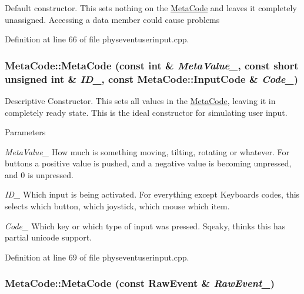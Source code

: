 Default constructor. This sets nothing on the \hyperlink{classMetaCode}{MetaCode} and leaves it completely unassigned. Accessing a data member could cause problems 

Definition at line 66 of file physeventuserinput.cpp.\hypertarget{classMetaCode_aaa5c96e46212847295db722a8253e86a}{
\subsubsection[{MetaCode}]{\setlength{\rightskip}{0pt plus 5cm}MetaCode::MetaCode (const int \& {\em MetaValue\_\-}, \/  const short unsigned int \& {\em ID\_\-}, \/  const {\bf MetaCode::InputCode} \& {\em Code\_\-})}}
\label{d7/d72/classMetaCode_aaa5c96e46212847295db722a8253e86a}


Descriptive Constructor. This sets all values in the \hyperlink{classMetaCode}{MetaCode}, leaving it in completely ready state. This is the ideal constructor for simulating user input. 
\begin{DoxyParams}{Parameters}
\item[{\em MetaValue\_\-}]How much is something moving, tilting, rotating or whatever. For buttons a positive value is pushed, and a negative value is becoming unpressed, and 0 is unpressed. \item[{\em ID\_\-}]Which input is being activated. For everything except Keyboards codes, this selects which button, which joystick, which mouse which item. \item[{\em Code\_\-}]Which key or which type of input was pressed. Sqeaky, thinks this has partial unicode support. \end{DoxyParams}


Definition at line 69 of file physeventuserinput.cpp.\hypertarget{classMetaCode_a87b260ce7ee3a66c75320c0fc37cdc0a}{
\subsubsection[{MetaCode}]{\setlength{\rightskip}{0pt plus 5cm}MetaCode::MetaCode (const RawEvent \& {\em RawEvent\_\-})}}
\label{d7/d72/classMetaCode_a87b260ce7ee3a66c75320c0fc37cdc0a}



